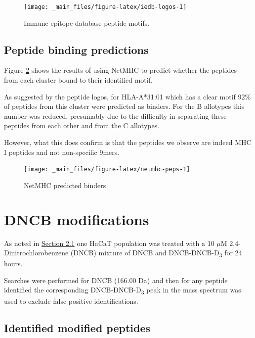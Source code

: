 \documentclass[12pt,]{book}
\begin{document}
\begin{figure}

{\centering \texttt{[image: \_main\_files/figure-latex/iedb-logos-1]} 

}

\caption{Immune epitope database peptide motifs.}\label{fig:iedb-logos}
\end{figure}

\section{Peptide binding predictions}\label{peptide-binding-predictions}

Figure \ref{fig:netmhc-peps} shows the results of using NetMHC to
predict whether the peptides from each cluster bound to their identified
motif.

As suggested by the peptide logos, for HLA-A*31:01 which has a clear
motif 92\% of peptides from this cluster were predicted as binders. For
the B allotypes this number was reduced, presumably due to the
difficulty in separating these peptides from each other and from the C
allotypes.

However, what this does confirm is that the peptides we observe are
indeed MHC I peptides and not non-specific 9mers.



\begin{figure}

{\centering \texttt{[image: \_main\_files/figure-latex/netmhc-peps-1]} 

}

\caption{NetMHC predicted binders}\label{fig:netmhc-peps}
\end{figure}

\hypertarget{dncb-modifications}{\chapter{DNCB
modifications}\label{dncb-modifications}}

As noted in \protect\hyperlink{cell-culture}{Section 2.1} one HaCaT
population was treated with a 10 \(\mu\)M 2,4-Dinitrochlorobenzene
(DNCB) mixture of DNCB and DNCB-DNCB-D\textsubscript{3} for 24 hours.

Searches were performed for DNCB (166.00 Da) and then for any peptide
identified the corresponding DNCB-DNCB-D\textsubscript{3} peak in the
mass spectrum was used to exclude false positive identifications.

\section{Identified modified
peptides}\label{identified-modified-peptides}
\end{document}
